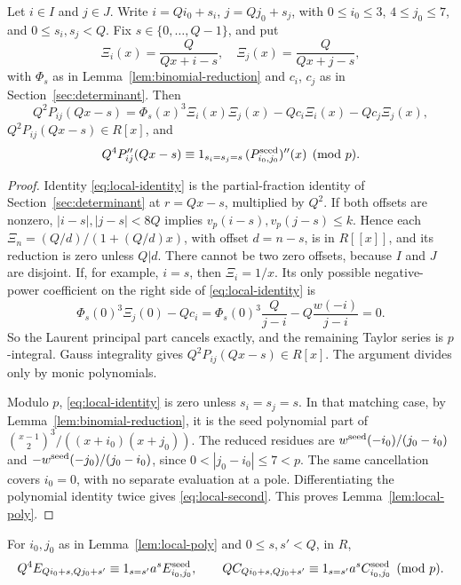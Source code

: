 \begin{lemma}\label{lem:local-poly}
Let \(i\in I\) and \(j\in J\). Write \(i=Qi_0+s_i\), \(j=Qj_0+s_j\), with \(0\le{}i_0\le3\), \(4\le{}j_0\le7\), and \(0\le{}s_i,s_j<Q\). Fix \(s\in\{0,\ldots,Q-1\}\), and put
\[
 \Xi_i(x)=\frac Q{Qx+i-s},\quad \Xi_j(x)=\frac Q{Qx+j-s},
\]
with \(\Phi_s\) as in Lemma~\ref{lem:binomial-reduction} and \(c_i\), \(c_j\) as in Section~\ref{sec:determinant}. Then
\begin{equation}\label{eq:local-identity}
 Q^2P_{ij}(Qx-s)
 =\Phi_s(x)^3\Xi_i(x)\Xi_j(x)-Qc_i\Xi_i(x)-Qc_j\Xi_j(x),
\end{equation}
\(Q^2P_{ij}(Qx-s) \in R[x]\), and
\begin{equation}\label{eq:local-second}
 Q^4P''_{ij}(Qx-s)\equiv
 1_{s_i=s_j=s}\,(P^{\rm seed}_{i_0,j_0})''(x)\pmod p.
\end{equation}
\end{lemma}

\begin{proof}
Identity \eqref{eq:local-identity} is the partial-fraction identity of Section~\ref{sec:determinant} at \(r=Qx-s\), multiplied by \(Q^2\). If both offsets are nonzero, \(|i-s|,|j-s|<8Q\) implies \(v_p(i-s),v_p(j-s)\le{}k\). Hence each \(\Xi_n=(Q/d)/(1+(Q/d)x)\), with offset \(d=n-s\), is in \(R[[x]]\), and its reduction is zero unless \(Q|d\). There cannot be two zero offsets, because \(I\) and \(J\) are disjoint. If, for example, \(i=s\), then \(\Xi_i=1/x\). Its only possible negative-power coefficient on the right side of \eqref{eq:local-identity} is
\[
 \Phi_s(0)^3\Xi_j(0)-Qc_i
 =\Phi_s(0)^3\frac Q{j-i}-Q\frac{w(-i)}{j-i}=0.
\]
So the Laurent principal part cancels exactly, and the remaining Taylor series is \(p\)-integral. Gauss integrality gives \(Q^2P_{ij}(Qx-s) \in R[x]\). The argument divides only by monic polynomials.

Modulo \(p\), \eqref{eq:local-identity} is zero unless \(s_i=s_j=s\). In that matching case, by Lemma~\ref{lem:binomial-reduction}, it is the seed polynomial part of \(\binom{x-1}{2}^3/((x+i_0)(x+j_0))\). The reduced residues are \(w^{\rm seed}(-i_0)/(j_0-i_0)\) and \(-w^{\rm seed}(-j_0)/(j_0-i_0)\), since \(0<|j_0-i_0|\le7<p\). The same cancellation covers \(i_0=0\), with no separate evaluation at a pole. Differentiating the polynomial identity twice gives \eqref{eq:local-second}. This proves Lemma~\ref{lem:local-poly}.
\end{proof}

\begin{lemma}\label{lem:entries}
For \(i_0,j_0\) as in Lemma~\ref{lem:local-poly} and \(0\le s,s'<Q\), in \(R\),
\[
 Q^4E_{Qi_0+s,Qj_0+s'}\equiv1_{s=s'}a^sE^{\rm seed}_{i_0,j_0},\qquad
 QC_{Qi_0+s,Qj_0+s'}\equiv1_{s=s'}a^sC^{\rm seed}_{i_0,j_0}\pmod p.
\]
\end{lemma}

